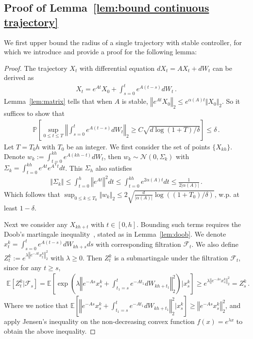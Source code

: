 \documentclass{article}
\theoremstyle{definition}
\begin{document}
\subsection{Proof of Lemma~\ref{lem:bound continuous trajectory}}\label{subsection: proof of state}
We first upper bound the radius of a single trajectory with stable controller, for which we introduce and provide a proof for the following lemma:
\continuous*
\begin{proof}
The trajectory $X_{t}$ with differential equation $dX_{t}=AX_{t}+dW_{t}$ can be derived as 
\begin{align*}
X_{t}=e^{At}X_{0}+\int_{s=0}^{t}e^{A(t-s)}dW_{t}\,.
\end{align*}
Lemma~\ref{lem:matrix} tells that when $A$ is stable, $\left\Vert e^{At}X_{0}\right\Vert_{2}\leq e^{\alpha(A)t}\Vert X_{0}\Vert _{2}$. So it suffices to show that 
\begin{align*}
\mathbb{P}\left[\sup_{0\leq t\leq T}\left\Vert \int_{s=0}^{t}e^{A(t-s)}dW_{t}\right\Vert _{2}\geq C\sqrt{d\log(1+T)/\delta}\right]\leq \delta\,.
\end{align*}
Let $T=T_{0}h$ with $T_{0}$ be an integer. We first consider the set of points $\{X_{kh}\}$. Denote $w_{k}:=\int_{t=0}^{kh}e^{A(kh-t)}dW_{t}$, then $w_{k}\sim\mathcal{N}(0,\Sigma_{k})$ with $\Sigma_{k}=\int_{t=0}^{kh}e^{At}e^{A^{\mathrm{T}}t}dt$. This $\Sigma_{h}$ also satisfies
\begin{align*}
\left\Vert \Sigma_{k}\right\Vert \leq\int_{t=0}^{h}\left\Vert e^{At}\right\Vert ^{2}dt\leq \int_{t=0}^{kh}e^{2\alpha(A)t}dt\leq \frac{1}{2\vert \alpha(A)\vert}\,.
\end{align*}
Which follows that $\sup_{0\leq k\leq T_{0}}\Vert w_{k}\Vert _{2}\leq 2\sqrt{\frac{d}{\vert \alpha(A)\vert} \log((1+T_{0})/\delta)}$, w.p. at least $1-\delta$.

Next we consider any $X_{kh+t}$ with $t\in[0,h]$. Bounding such terms requires the Doob's martingale inequality~\citep{durrettprobability}, stated as in Lemma~\ref{lem:doob}. We denote $x^{k}_{t}=\int_{s=0}^{t}e^{A(t-s)}dW_{kh+s}ds$ with corresponding filtration $\mathcal{F}_{t}$. We also 
define $Z^{k}_{t}:=e^{\lambda\left\Vert e^{-At}x^{k}_{t}\right\Vert ^{2}_{2}}$ with $\lambda\geq 0$. Then $Z^{k}_{t}$ is a submartingale under the filtration $\mathcal{F}_{t}$, since for any $t\geq s$,
\begin{align*}
\mathbb{E}\left[Z^{k}_{t}\vert \mathcal{F}_{s}\right]=\mathbb{E}\left[\exp\left(\lambda\left\Vert e^{-As}x^{k}_{s}+\int_{t_{1}=s}^{t}e^{-At_{1}}dW_{kh+t_{1}}\right\Vert ^{2}_{2}\right)\big\vert x^{k}_{s}\right]
\geq e^{\lambda\left\Vert e^{-As}x^{k}_{s}\right\Vert_{2} ^{2}}=Z^{k}_{s}\,.
\end{align*}
Where we notice that $\mathbb{E}\left[\left\Vert e^{-As}x^{k}_{s}+\int_{t_{1}=s}^{t}e^{-At_{1}}dW_{kh+t_{1}}\right\Vert ^{2}_{2}\big\vert x^{k}_{s} \right]\geq\left\Vert e^{-As}x^{k}_{s}\right\Vert_{2} ^{2}$, and apply Jensen's inequality on the non-decreasing convex function $f(x)=e^{\lambda x}$ to obtain the above inequality.


\end{proof}
\end{document}
